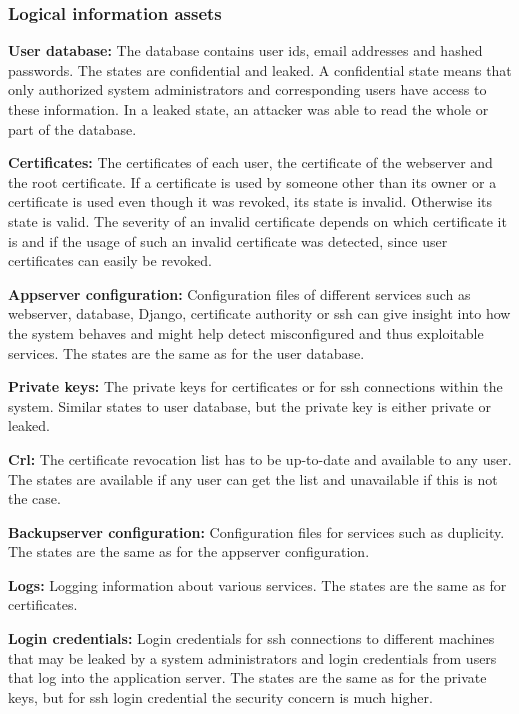 \documentclass[english]{article}
\begin{document}
\subsubsection{Logical information assets}
	\begin{description}
		\item{\textbf{User database:}} The database contains user ids, email addresses and hashed passwords. The states are confidential and leaked. A confidential state means that only authorized system administrators and corresponding users have access to these information. In a leaked state, an attacker was able to read the whole or part of the database.
		\item{\textbf{Certificates:}} The certificates of each user, the certificate of the webserver and the root certificate. If a certificate is used by someone other than its owner or a certificate is used even though it was revoked, its state is invalid. Otherwise its state is valid. The severity of an invalid certificate depends on which certificate it is and if the usage of such an invalid certificate was detected, since user certificates can easily be revoked.
		\item{\textbf{Appserver configuration:}} Configuration files of different services such as webserver, database, Django, certificate authority or ssh can give insight into how the system behaves and might help detect misconfigured and thus exploitable services. The states are the same as for the user database.
		\item{\textbf{Private keys:}} The private keys for certificates or for ssh connections within the system. Similar states to user database, but the private key is either private or leaked.
		\item{\textbf{Crl:}} The certificate revocation list has to be up-to-date and available to any user. The states are available if any user can get the list and unavailable if this is not the case.
		\item{\textbf{Backupserver configuration:}} Configuration files for services such as duplicity. The states are the same as for the appserver configuration.
		\item{\textbf{Logs:}} Logging information about various services. The states are the same as for certificates.
		\item{\textbf{Login credentials:}} Login credentials for ssh connections to different machines that may be leaked by a system administrators and login credentials from users that log into the application server. The states are the same as for the private keys, but for ssh login credential the security concern is much higher.

\end{description}
\end{document}
